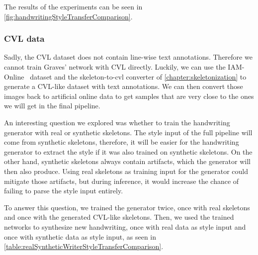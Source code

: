 The results of the experiments can be seen in \cref{fig:handwritingStyleTransferComparison}.

\subsubsection{CVL data}
Sadly, the CVL dataset does not contain line-wise text annotations. Therefore we cannot train Graves' network with CVL directly. Luckily, we can use the IAM-Online~\cite{iam-online} dataset and the skeleton-to-cvl converter of \cref{chapter:skeletonization} to generate a CVL-like dataset with text annotations. We can then convert those images back to artificial online data to get samples that are very close to the ones we will get in the final pipeline.

An interesting question we explored was whether to train the handwriting generator with real or synthetic skeletons. The style input of the full pipeline will come from synthetic skeletons, therefore, it will be easier for the handwriting generator to extract the style if it was also trained on synthetic skeletons. On the other hand, synthetic skeletons always contain artifacts, which the generator will then also produce. Using real skeletons as training input for the generator could mitigate those artifacts, but during inference, it would increase the chance of failing to parse the style input entirely.

To answer this question, we trained the generator twice, once with real skeletons and once with the generated CVL-like skeletons. Then, we used the trained networks to synthesize new handwriting, once with real data as style input and once with synthetic data as style input, as seen in \cref{table:realSyntheticWriterStyleTransferComparison}.

